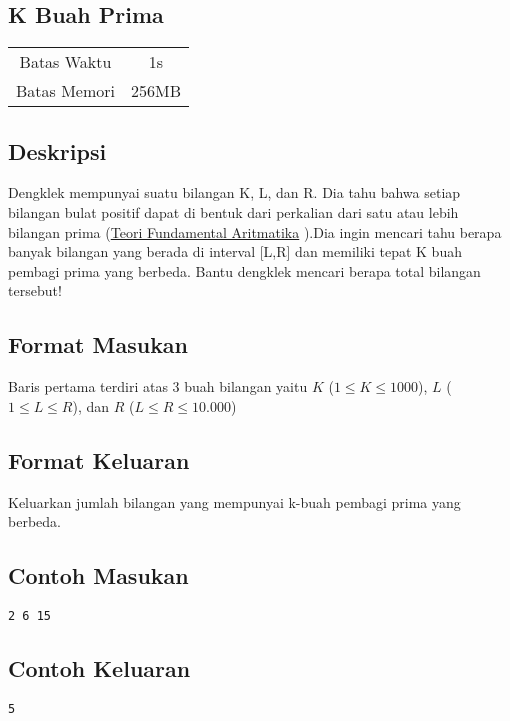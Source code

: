 \documentclass{article}
\begin{document}
\begin{center}

    
    \section*{K Buah Prima} %

    \begin{tabular}{ | c c | }
        \hline
        Batas Waktu  & 1s \\    %
        Batas Memori & 256MB \\  %
        \hline
    \end{tabular}
\end{center}

\subsection*{Deskripsi}
Dengklek mempunyai suatu bilangan K, L, dan R. Dia tahu bahwa setiap bilangan bulat positif dapat di bentuk dari perkalian dari satu atau lebih bilangan prima (\href{https://mathworld.wolfram.com/FundamentalTheoremofArithmetic.html}{Teori Fundamental Aritmatika} ).Dia ingin mencari tahu berapa banyak bilangan yang berada di interval [L,R] dan memiliki tepat K buah pembagi prima yang berbeda. Bantu dengklek mencari berapa total bilangan tersebut!

\subsection*{Format Masukan}

Baris pertama terdiri atas 3 buah bilangan yaitu $K$ ($1 \leq K \leq 1000$), $L$ ($1 \leq L \leq R$), dan $R$ ($L \leq R \leq 10.000$)

\subsection*{Format Keluaran}

Keluarkan jumlah bilangan yang mempunyai k-buah pembagi prima yang berbeda.
\\

\begin{multicols}{2}
\subsection*{Contoh Masukan}
\begin{lstlisting}
2 6 15
\end{lstlisting}
\columnbreak
\subsection*{Contoh Keluaran}
\begin{lstlisting}
5
\end{lstlisting}
\vfill
\null
\end{multicols}
\end{document}

